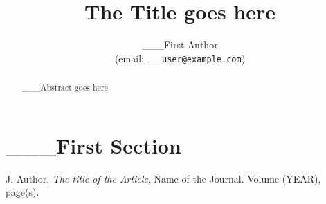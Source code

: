 \documentclass[a4paper,12pt]{report}
\title{The Title goes here}
\author{
  ___First Author\\
  (email: {\tt ___user@example.com}) \\
}
\begin{document}
\maketitle

\begin{abstract}
___Abstract goes here
\end{abstract}

\tableofcontents
\newpage
\listoffigures
\newpage

\section{___First Section}



\begin{thebibliography}{99}
J. Author, {\em The title of the Article}, Name of the Journal. Volume 
 (YEAR), page(s).                                           
         

\end{thebibliography}
\end{document}
